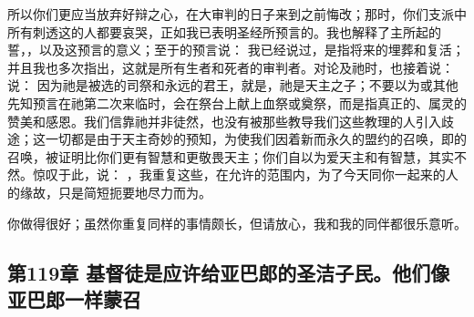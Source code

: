  所以你们更应当放弃好辩之心，在大审判的日子来到之前悔改；那时，你们支派中所有刺透这的人都要哀哭，正如我已表明圣经所预言的。我也解释了主所起的誓，，以及这预言的意义；至于的预言说： 我已经说过，是指将来的埋葬和复活；并且我也多次指出，这就是所有生者和死者的审判者。对论及祂时，也接着说： 说： 因为祂是被选的司祭和永远的君王，就是，祂是天主之子；不要以为或其他先知预言在祂第二次来临时，会在祭台上献上血祭或奠祭，而是指真正的、属灵的赞美和感恩。我们信靠祂并非徒然，也没有被那些教导我们这些教理的人引入歧途；这一切都是由于天主奇妙的预知，为使我们因着新而永久的盟约的召唤，即的召唤，被证明比你们更有智慧和更敬畏天主；你们自以为爱天主和有智慧，其实不然。惊叹于此，说： ，我重复这些，在允许的范围内，为了今天同你一起来的人的缘故，只是简短扼要地尽力而为。\par

 你做得很好；虽然你重复同样的事情颇长，但请放心，我和我的同伴都很乐意听。\par


\subsection{第119章 基督徒是应许给亚巴郎的圣洁子民。他们像亚巴郎一样蒙召}

